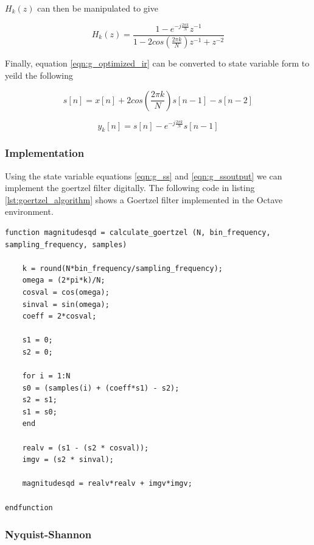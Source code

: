 $H_k(z)$ can then be manipulated to give

\begin{equation}
\label{eqn:g_optimized_ir}
H_k(z) = \frac{1 - e^{-j\frac{2\pi k}{N}}z^{-1}}{1 - 2cos(\frac{2\pi k}{N})z^{-1} + z^{-2}}
\end{equation}

Finally, equation \ref{eqn:g_optimized_ir} can be converted to state variable form to yeild the following


\begin{equation}
	\label{eqn:g_ss}
	s[n] = x[n]+2cos(\frac{2\pi k}{N})s[n-1]-s[n-2]
\end{equation}


\begin{equation}
	\label{eqn:g_ssoutput}
	y_k[n] = s[n]-e^{-j\frac{2\pi k}{N}}s[n-1]
\end{equation}



\subsubsection{Implementation}
\label{sec:goertzel_implementation}
Using the state variable equations \ref{eqn:g_ss} and \ref{eqn:g_ssoutput} we can implement the goertzel filter digitally. The following code in listing \ref{lst:goertzel_algorithm} shows a Goertzel filter implemented in the Octave environment.

\begin{lstlisting}[caption={Goertzel Algorithm - Octave Implementation\label{lst:goertzel_algorithm}}]
function magnitudesqd = calculate_goertzel (N, bin_frequency, sampling_frequency, samples)

	k = round(N*bin_frequency/sampling_frequency);
	omega = (2*pi*k)/N;
	cosval = cos(omega);
	sinval = sin(omega);
	coeff = 2*cosval;
	
	s1 = 0;
	s2 = 0;
	
	for i = 1:N
	s0 = (samples(i) + (coeff*s1) - s2);
	s2 = s1;
	s1 = s0;    
	end
	
	realv = (s1 - (s2 * cosval));
	imgv = (s2 * sinval);  
	
	magnitudesqd = realv*realv + imgv*imgv;

endfunction
\end{lstlisting}

\subsubsection{Nyquist-Shannon}

